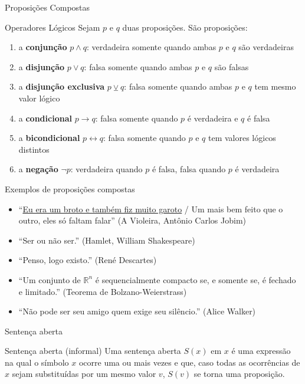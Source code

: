 \begin{frame}[fragile]{Proposições Compostas}

    \begin{block}{Operadores Lógicos}
        Sejam $p$ e $q$ duas proposições. São proposições:
        \begin{enumerate}
            \item a \textbf{conjunção} $p \land q$: verdadeira somente quando ambas $p$ e $q$ são verdadeiras
            \item a \textbf{disjunção} $p \lor q$: falsa somente quando ambas $p$ e $q$ são falsas
            \item a \textbf{disjunção exclusiva} $p \veebar q$: falsa somente quando ambas $p$ e $q$ tem mesmo valor lógico
            \item a \textbf{condicional} $p \to q$: falsa somente quando $p$ é verdadeira e $q$ é falsa
            \item a \textbf{bicondicional} $p \leftrightarrow q$: falsa somente quando $p$ e $q$ tem valores lógicos distintos
            \item a \textbf{negação} $\lnot p$: verdadeira quando $p$ é falsa, falsa quando $p$ é verdadeira
        \end{enumerate}
    \end{block}

\end{frame}

\begin{frame}[fragile]{Exemplos de proposições compostas}

    \begin{itemize}
        \item ``\underline{Eu era um broto e também fiz muito garoto} / 
            Um mais bem feito que o outro, eles só faltam falar'' (A Violeira, Antônio Carlos Jobim)
        \item ``Ser ou não ser.'' (Hamlet, William Shakespeare)
        \item ``Penso, logo existo.'' (René Descartes)
        \item ``Um conjunto de $\mathbb{R}^{n}$ é sequencialmente compacto se, e somente se, é fechado e limitado.'' (Teorema de Bolzano-Weierstrass) 
        \item ``Não pode ser seu amigo quem exige seu silêncio.'' (Alice Walker)
    \end{itemize}

\end{frame}

\begin{frame}[fragile]{Sentença aberta}

    \begin{block}{Sentença aberta (informal)}
        Uma sentença aberta $S(x)$ em $x$ é uma expressão na qual o símbolo $x$ ocorre uma 
        ou mais vezes e que, caso todas as ocorrências de $x$ sejam substituídas por um 
        mesmo valor $v$, $S(v)$ se torna uma proposição.
    \end{block}

\end{frame}

